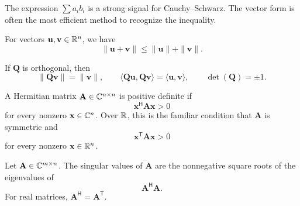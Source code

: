     \begin{strategy}
        The expression $\sum a_i b_i$ is a strong signal for Cauchy--Schwarz.
        The vector form is often the most efficient method to recognize the inequality.
    \end{strategy}

    \begin{corollary}
        For vectors $\mathbf{u},\mathbf{v}\in\mathbb{R}^n$, we have
        \[
            \|\mathbf{u}+\mathbf{v}\|
            \leq
            \|\mathbf{u}\|+\|\mathbf{v}\|.
        \]
    \end{corollary}

    \begin{proposition}
        If $\mathbf{Q}$ is orthogonal, then
        \[
            \|\mathbf{Q}\mathbf{v}\|=\|\mathbf{v}\|,
            \qquad
            \langle\mathbf{Q}\mathbf{u},\mathbf{Q}\mathbf{v}\rangle
            =
            \langle\mathbf{u},\mathbf{v}\rangle,
            \qquad
            \det(\mathbf{Q})=\pm 1.
        \]
    \end{proposition}

    \begin{definition}
        A Hermitian matrix $\mathbf{A}\in\mathbb{C}^{n\times n}$ is positive definite if
        \[
            \mathbf{x}^{\mathsf H}\mathbf{A}\mathbf{x}>0
        \]
        for every nonzero $\mathbf{x}\in\mathbb{C}^n$. Over $\mathbb{R}$, this is the familiar
        condition that $\mathbf{A}$ is symmetric and
        \[
            \mathbf{x}^{\mathsf T}\mathbf{A}\mathbf{x}>0
        \]
        for every nonzero $\mathbf{x}\in\mathbb{R}^n$.
    \end{definition}

    \begin{definition}
        Let $\mathbf{A}\in\mathbb{C}^{m\times n}$. The singular values of
        $\mathbf{A}$ are the nonnegative square roots of the eigenvalues of
        \[
            \mathbf{A}^{\mathsf H}\mathbf{A}.
        \]
        For real matrices, $\mathbf{A}^{\mathsf H}=\mathbf{A}^{\mathsf T}$.
    \end{definition}

